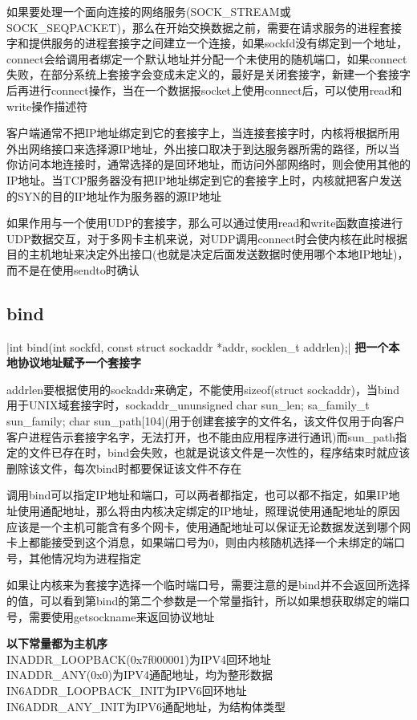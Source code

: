 \begin{spacing}{2.0}
如果要处理一个面向连接的网络服务(SOCK\_STREAM或SOCK\_SEQPACKET)，那么在开始交换数据之前，需要在请求服务的进程套接字和提供服务的进程套接字之间建立一个连接，如果sockfd没有绑定到一个地址，connect会给调用者绑定一个默认地址并分配一个未使用的随机端口，如果connect失败，在部分系统上套接字会变成未定义的，最好是关闭套接字，新建一个套接字后再进行connect操作，当在一个数据报socket上使用connect后，可以使用read和write操作描述符

客户端通常不把IP地址绑定到它的套接字上，当连接套接字时，内核将根据所用外出网络接口来选择源IP地址，外出接口取决于到达服务器所需的路径，所以当你访问本地连接时，通常选择的是回环地址，而访问外部网络时，则会使用其他的IP地址。当TCP服务器没有把IP地址绑定到它的套接字上时，内核就把客户发送的SYN的目的IP地址作为服务器的源IP地址

如果作用与一个使用UDP的套接字，那么可以通过使用read和write函数直接进行UDP数据交互，对于多网卡主机来说，对UDP调用connect时会使内核在此时根据目的主机地址来决定外出接口(也就是决定后面发送数据时使用哪个本地IP地址)，而不是在使用sendto时确认
\end{spacing}
\newpage

\subsection{bind}
|int bind(int sockfd, const struct sockaddr *addr,
socklen_t addrlen);|
\noindent \textbf{把一个本地协议地址赋予一个套接字}
\begin{spacing}{2.0}
addrlen要根据使用的sockaddr来确定，不能使用sizeof(struct sockaddr)，当bind用于UNIX域套接字时，sockaddr\_un{unsigned char sun\_len; sa\_family\_t sun\_family; char sun\_path[104](用于创建套接字的文件名，该文件仅用于向客户客户进程告示套接字名字，无法打开，也不能由应用程序进行通讯)}而sun\_path指定的文件已存在时，bind会失败，也就是说该文件是一次性的，程序结束时就应该删除该文件，每次bind时都要保证该文件不存在

调用bind可以指定IP地址和端口，可以两者都指定，也可以都不指定，如果IP地址使用通配地址，那么将由内核决定绑定的IP地址，照理说使用通配地址的原因应该是一个主机可能含有多个网卡，使用通配地址可以保证无论数据发送到哪个网卡上都能接受到这个消息，如果端口号为0，则由内核随机选择一个未绑定的端口号，其他情况均为进程指定

如果让内核来为套接字选择一个临时端口号，需要注意的是bind并不会返回所选择的值，可以看到第bind的第二个参数是一个常量指针，所以如果想获取绑定的端口号，需要使用getsockname来返回协议地址

\vskip 0.5in
\textbf{以下常量都为主机序} \\
\indent INADDR\_LOOPBACK(0x7f000001)为IPV4回环地址 \\
\indent INADDR\_ANY(0x0)为IPV4通配地址，均为整形数据 \\
\indent IN6ADDR\_LOOPBACK\_INIT为IPV6回环地址 \\
\indent IN6ADDR\_ANY\_INIT为IPV6通配地址，为结构体类型 \\
\end{spacing}
\newpage

